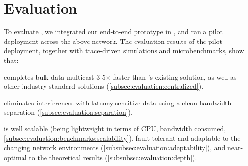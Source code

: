 \section{Evaluation}
\label{sec:evaluation}

To evaluate \name, we integrated our end-to-end prototype in \company, and ran a pilot deployment across the above network.
The evaluation results of the pilot deployment, together with trace-driven simulations and microbenchmarks, show that:
\begin{packedenumerate}
\item \name completes bulk-data multicast 3-5$\times$ faster than \company's existing solution, as well as other industry-standard solutions (\Section\ref{subsec:evaluation:centralized}).
\item \name eliminates interferences with latency-sensitive data using a clean bandwidth separation (\Section\ref{subsec:evaluation:separation}).
\item \name is well scalable (being lightweight in terms of CPU, bandwidth consumed, \Section\ref{subsec:evaluation:benchmarks:scalability}), fault tolerant and adaptable to the changing network environments (\Section\ref{subsubsec:evaluation:adaptability}), and near-optimal to the theoretical results (\Section\ref{subsubsec:evaluation:depth}).
\end{packedenumerate}

